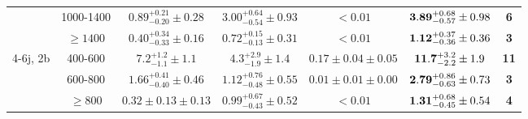 \begin{table}[!ht]
{\begin{tabular}{c|c||c|c|c|c|c}
 & 1000-1400 & $0.89^{+0.21}_{-0.20}\pm0.28$ & $3.00^{+0.64}_{-0.54}\pm0.93$ & $<0.01$ & ${\bf 3.89}^{+0.68}_{-0.57}\pm0.98$ & {\bf 6}\\ 
 & $\geq1400$ & $0.40^{+0.34}_{-0.33}\pm0.16$ & $0.72^{+0.15}_{-0.13}\pm0.31$ & $<0.01$ & ${\bf 1.12}^{+0.37}_{-0.36}\pm0.36$ & {\bf 3}\\ 
\hline
\multirow{3}{*}{4-6j, 2b} & 400-600 & $7.2^{+1.2}_{-1.1}\pm1.1$ & $4.3^{+2.9}_{-1.9}\pm1.4$ & $0.17\pm0.04\pm0.05$ & ${\bf 11.7}^{+3.2}_{-2.2}\pm1.9$ & {\bf 11}\\ 
 & 600-800 & $1.66^{+0.41}_{-0.40}\pm0.46$ & $1.12^{+0.76}_{-0.48}\pm0.55$ & $0.01\pm0.01\pm0.00$ & ${\bf 2.79}^{+0.86}_{-0.63}\pm0.73$ & {\bf 3}\\ 
 & $\geq800$ & $0.32\pm0.13\pm0.13$ & $0.99^{+0.67}_{-0.43}\pm0.52$ & $<0.01$ & ${\bf 1.31}^{+0.68}_{-0.45}\pm0.54$ & {\bf 4}\\ 

\hline
\end{tabular}}
\end{table}



